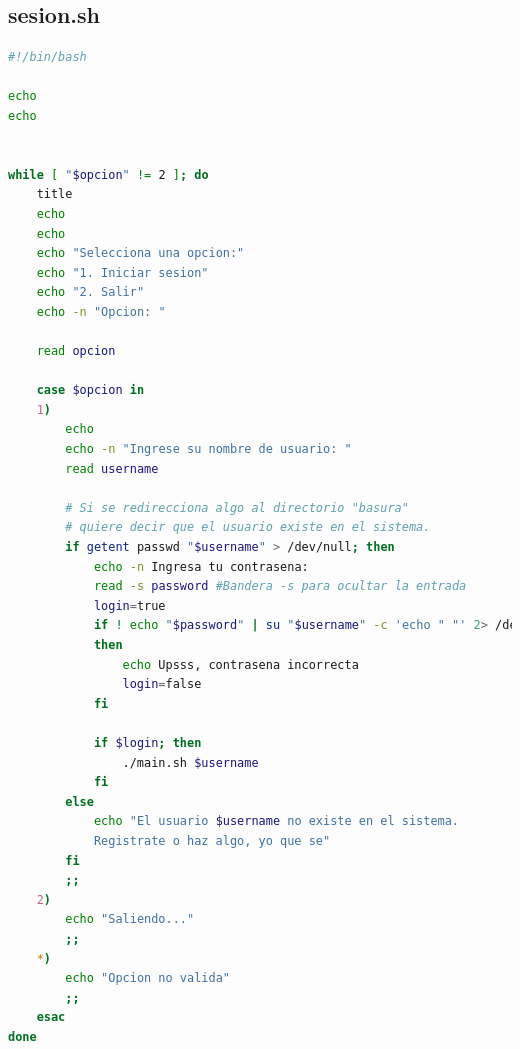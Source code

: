 \documentclass[letter,11pt]{article}
\begin{document}
\subsection{sesion.sh}
\begin{lstlisting}[language=sh, caption={Ventana de de inicio de sesión.}, label={lst:shellscript}, basicstyle=\small]
#!/bin/bash

echo
echo


while [ "$opcion" != 2 ]; do
    title
    echo
    echo
    echo "Selecciona una opcion:"
    echo "1. Iniciar sesion"
    echo "2. Salir"
    echo -n "Opcion: "

    read opcion

    case $opcion in 
    1)
        echo
        echo -n "Ingrese su nombre de usuario: "
        read username

        # Si se redirecciona algo al directorio "basura"
        # quiere decir que el usuario existe en el sistema.
        if getent passwd "$username" > /dev/null; then
            echo -n Ingresa tu contrasena:
            read -s password #Bandera -s para ocultar la entrada
            login=true
            if ! echo "$password" | su "$username" -c 'echo " "' 2> /dev/null; 
            then
                echo Upsss, contrasena incorrecta
                login=false
            fi

            if $login; then
                ./main.sh $username
            fi
        else
            echo "El usuario $username no existe en el sistema. 
            Registrate o haz algo, yo que se"
        fi
        ;;
    2)
        echo "Saliendo..."
        ;;
    *)
        echo "Opcion no valida"
        ;;
    esac
done


\end{lstlisting}
\end{document}
